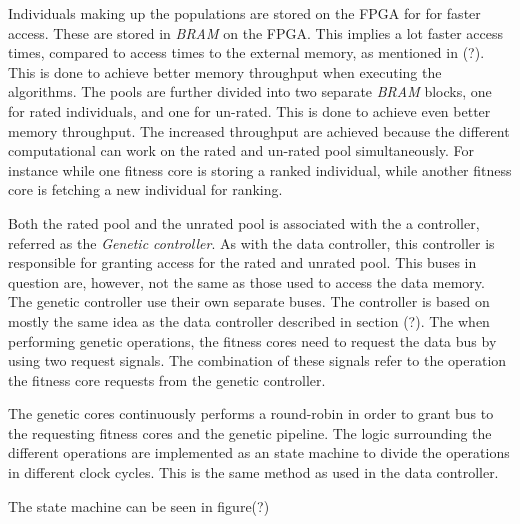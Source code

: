Individuals making up the populations are stored on the FPGA for for faster access. These are stored in \emph{BRAM} on the FPGA. This implies a lot faster access times, compared to access times to the external memory, as mentioned in (?). This is done to achieve better memory throughput when executing the algorithms. The pools are further divided into two separate \emph{BRAM} blocks, one for rated individuals, and one for un-rated. This is done to achieve even better memory throughput. The increased throughput are achieved because the different computational can work on the rated and un-rated pool simultaneously. For instance while one fitness core is storing a ranked individual, while another fitness core is fetching a new individual for ranking. 


Both the rated pool and the unrated pool is associated with the a controller, referred as the \emph{Genetic controller}. As with the data controller, this controller is responsible for granting access for the rated and unrated pool. This buses in question are, however, not the same as those used to access the data memory. The genetic controller use their own separate buses. The controller is based on mostly the same idea as the data controller described in section (?). The when performing genetic operations, the fitness cores need to request the data bus by using two request signals. The combination of these signals refer to the operation the fitness core requests from the genetic controller. 

The genetic cores continuously performs a round-robin in order to grant bus to the requesting fitness cores and the genetic pipeline. The logic surrounding the different operations are implemented as an state machine to divide the operations in different clock cycles. This is the same method as used in the data controller.







The state machine can be seen in figure(?)



